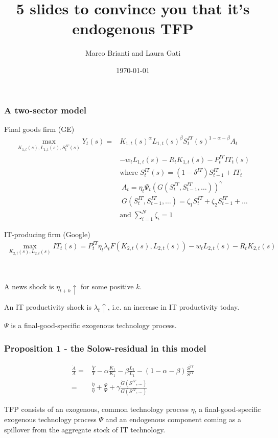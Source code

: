 \documentclass{beamer}
\author[Brianti, Gati]{Marco Brianti and Laura Gati}
\institute[Boston College]{Boston College}
\title{5 slides to convince you that it's endogenous TFP}
\date{\today}
\begin{document}
\begin{frame}

\maketitle


\end{frame}


\begin{frame}
\frametitle{A two-sector model}

Final goods firm (GE)
\begin{align*}
\max_{K_{1,t}(s), L_{1,t}(s), S^{IT}_t(s) } Y_t(s) =  & K_{1,t}(s)^{\alpha}L_{1,t}(s)^{\beta}S^{IT}_t(s)^{1-\alpha - \beta}A_t \\
 & - w_t L_{1,t}(s) -R_tK_{1,t}(s) -P^{IT}_t IT_t(s) \\
 & \text{where} \; S^{IT}_t(s) =  (1-\delta^{IT})S^{IT}_{t-1} + IT_t \\
 &  \; A_t =  \eta_t \Psi_t (G(S^{IT}_t,S^{IT}_{t-1},\dots))^{\gamma} \\
 &  \; G(S^{IT}_t,S^{IT}_{t-1},\dots) = \zeta_1 S_t^{IT} + \zeta_2 S^{IT}_{t-1} + \dots \\
  & \text{and} \; \sum_{i=1}^{N} \zeta_i = 1
\end{align*}

\end{frame}

\begin{frame}

IT-producing firm (Google)
\begin{align*}
\max_{K_{2,t}(s), L_{2,t}(s)} IT_t(s) = P^{IT}_t \eta_t \lambda_t F(K_{2,t}(s), L_{2,t}(s)) -w_t L_{2,t}(s) - R_t K_{2,t}(s)
\end{align*}

\

A news shock is $\eta_{t+k} \uparrow$ for some positive $k$. 

An IT productivity shock is $\lambda_{t} \uparrow$, i.e. an increase in IT productivity today. 

$\Psi$ is a final-good-specific exogenous technology process.

\end{frame}

\begin{frame}
\frametitle{Proposition 1 - the Solow-residual in this model}

\begin{align*}
\frac{\dot{A}}{A} = & \frac{\dot{Y}}{Y} - \alpha \frac{\dot{K_1}}{K_1} - \beta \frac{\dot{L_1}}{L_1} - (1-\alpha - \beta) \frac{\dot{S^{IT}}}{S^{IT}} \\
= & \frac{\dot{\eta}}{\eta} + \frac{\dot{\Psi}}{\Psi} + \gamma \frac{\dot{G}(S^{IT},\dots)}{G(S^{IT},\dots)}
\end{align*}

TFP consists of an exogenous, common technology process $\eta$, a final-good-specific exogenous technology process $\Psi$ and an endogenous component coming as a spillover from the aggregate stock of IT technology. 
\end{frame}
\end{document}
